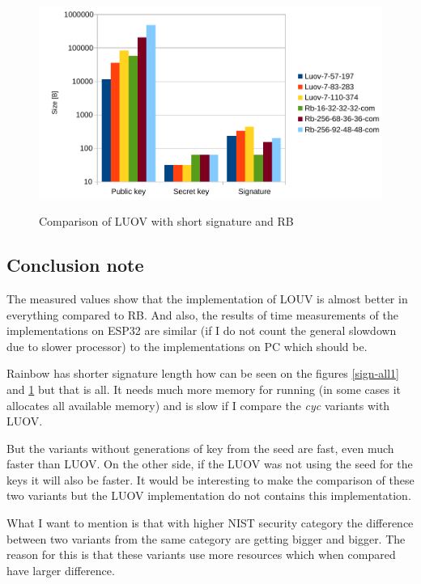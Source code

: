 \documentclass[thesis=M,english]{FITthesis}[2019/12/23]
\begin{document}
\bigskip\bigskip\bigskip
\begin{figure}[H]
\centering
\includegraphics[width=13cm,height=7cm]{images/mem-sign-all2.pdf}
\caption{Comparison of LUOV with short signature and RB}
\label{sign-all2}
\end{figure}

\newpage
\subsection{Conclusion note}
The measured values show that the implementation of LOUV is almost better in everything compared to RB. And also, the results of time measurements of the implementations on ESP32 are similar (if I do not count the general slowdown due to slower processor) to the implementations on PC which should be.

\bigskip
\noindent
Rainbow has shorter signature length how can be seen on the figures \ref{sign-all1} and \ref{sign-all2} but that is all. It needs much more memory for running (in some cases it allocates all available memory) and is slow if I compare the \textit{cyc} variants with LUOV.

\bigskip
\noindent
But the variants without generations of key from the seed are fast, even much faster than LUOV. On the other side, if the LUOV was not using the seed for the keys it will also be faster. It would be interesting to make the comparison of these two variants but the LUOV implementation do not contains this implementation.

\bigskip
\noindent
What I want to mention is that with higher NIST security category the difference between two variants from the same category are getting bigger and bigger. The reason for this is that these variants use more resources which when compared have larger difference. 
\end{document}
